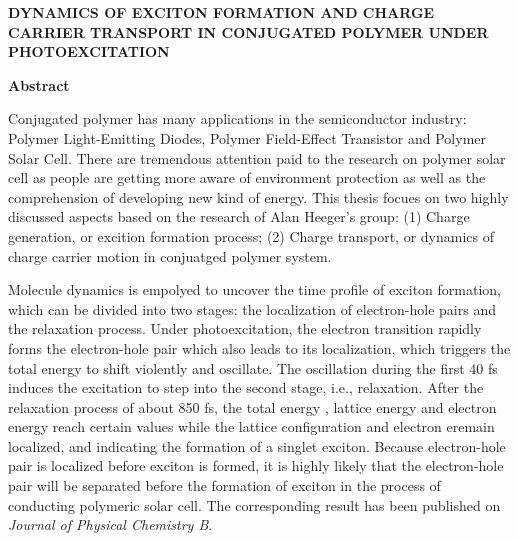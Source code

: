 \documentclass[12pt,]{report}
\begin{document}
\vspace*{0.0cm}

\begin{center}
\Large \textbf{DYNAMICS OF EXCITON FORMATION AND CHARGE CARRIER TRANSPORT IN CONJUGATED POLYMER UNDER PHOTOEXCITATION}
\end{center}\vspace{0.54cm}\begin{center}
\Large \textbf{Abstract}
\end{center}

\pagestyle{plain}

\vspace{1.5cm}


Conjugated polymer has many applications in the semiconductor industry:
Polymer Light-Emitting Diodes, Polymer Field-Effect Transistor and
Polymer Solar Cell. There are tremendous attention paid to the research
on polymer solar cell as people are getting more aware of environment
protection as well as the comprehension of developing new kind of
energy. This thesis focues on two highly discussed aspects based on the
research of Alan Heeger's group: (1) Charge generation, or excition
formation process; (2) Charge transport, or dynamics of charge carrier
motion in conjuatged polymer system.

Molecule dynamics is empolyed to uncover the time profile of exciton
formation, which can be divided into two stages: the localization of
electron-hole pairs and the relaxation process. Under photoexcitation,
the electron transition rapidly forms the electron-hole pair which also
leads to its localization, which triggers the total energy to shift
violently and oscillate. The oscillation during the first 40 fs induces
the excitation to step into the second stage, i.e., relaxation. After
the relaxation process of about 850 fs, the total energy , lattice
energy and electron energy reach certain values while the lattice
configuration and electron eremain localized, and indicating the
formation of a singlet exciton. Because electron-hole pair is localized
before exciton is formed, it is highly likely that the electron-hole
pair will be separated before the formation of exciton in the process of
conducting polymeric solar cell. The corresponding result has been
published on \emph{Journal of Physical Chemistry B}.
\end{document}
